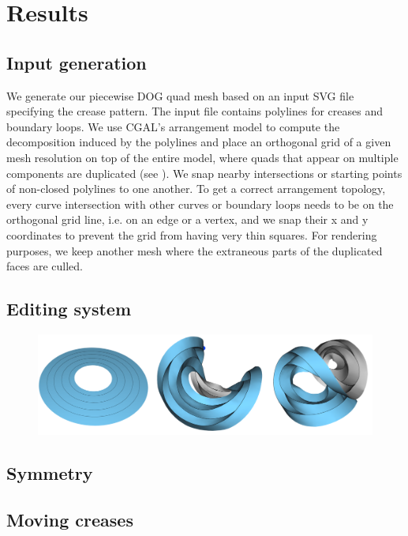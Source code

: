 \section{Results} \label{sec:results}
\subsection{Input generation}
We generate our piecewise DOG quad mesh based on an input SVG file specifying the crease pattern. The input file contains polylines for creases and boundary loops. We use CGAL's arrangement model \cite{cgal,cgal_arr1,cgal_arr2} to compute the decomposition induced by the polylines and place an orthogonal grid of a given mesh resolution on top of the entire model, where quads that appear on multiple components are duplicated (see ). We snap nearby intersections or starting points of non-closed polylines to one another. To get a correct arrangement topology, every curve intersection with other curves or boundary loops needs to be on the orthogonal grid line, i.e. on an edge or a vertex, and we snap their x and y coordinates to prevent the grid from having very thin squares. For rendering purposes, we keep another mesh where the extraneous parts of the duplicated faces are culled.
\subsection{Editing system}
\begin{figure} [h]
	\centering
	\includegraphics[width=\linewidth]{figures/annulus}
	\caption{ }
	\label{fig:annulus}
\end{figure}
\subsection{Symmetry}
\subsection{Moving creases}